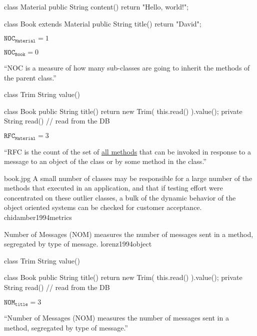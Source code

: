 \documentclass{article}
\begin{document}
{
\begin{multicols}{2}
{\small\begin{ffcode}
class Material {
  public String content() {
    return "Hello, world!";
  }
}

class Book extends Material {
  public String title() {
    return "David";
  }
}
\end{ffcode}
}
\par\columnbreak\par
\(\texttt{NOC}_\texttt{Material} = 1\)\par
\(\texttt{NOC}_\texttt{Book} = 0\)\par
``NOC is a measure of how many sub-classes are going to inherit the methods of the parent class.''
\end{multicols}
\plush{}

\begin{multicols}{2}
{\small\begin{ffcode}
class Trim
  String value()

class Book
  public String title()
    return new Trim(
      this.read()
    ).value();
  private String read()
    // read from the DB
\end{ffcode}
}
\par\columnbreak\par
\(\texttt{RFC}_\texttt{Material} = 3\)\par
``RFC is the count of the set of \ul{all methods} that can be invoked in response to a message to an object of the class or by some method in the class.''
\end{multicols}
\plush{}

\qte
  {book.jpg}
  {A small number of classes may be responsible for a large number of the methods that executed in an application, and that if testing effort were concentrated on these outlier classes, a bulk of the dynamic behavior of the object oriented systems can be checked for customer acceptance.}
  {chidamber1994metrics}

  {Number of Messages (NOM) measures the number of messages sent in a method, segregated by type of message.}
  {lorenz1994object}

\begin{multicols}{2}
{\small\begin{ffcode}
class Trim
  String value()

class Book
  public String title()
    return new Trim(
      this.read()
    ).value();
  private String read()
    // read from the DB
\end{ffcode}
}
\par\columnbreak\par
\(\texttt{NOM}_\texttt{title} = 3\)\par
``Number of Messages (NOM) measures the number of messages sent in a method, segregated by type of message.''
\end{multicols}
\plush{}

}
\end{document}
